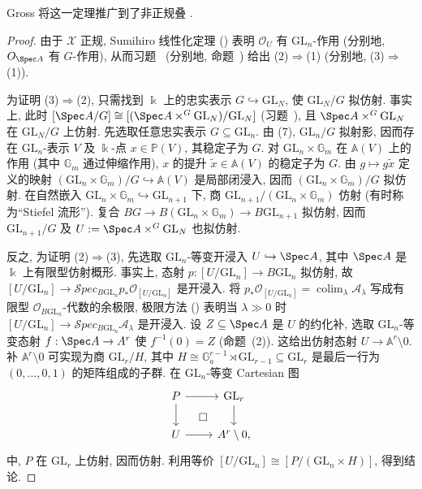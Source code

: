 \begin{remark}\label{src:7.2.13}
Gross 将这一定理推广到了非正规叠 \cite{Gro17}.
\end{remark}
\begin{proof}
由于 $\mathcal X$ 正规, Sumihiro 线性化定理 () 表明 $\mathcal O_U$ 有 $\mathrm{GL}_n$-作用 (分别地, $\mathcal O_{\Spec A}$ 有 $G$-作用), 从而习题~ (分别地, 命题~) 给出 (2)$\Rightarrow$(1) (分别地, (3)$\Rightarrow$(1)).

为证明 (3)$\Rightarrow$(2), 只需找到 $\Bbbk$ 上的忠实表示 $G\hookrightarrow\mathrm{GL}_N$, 使 $\mathrm{GL}_N/G$ 拟仿射. 事实上, 此时 $[\Spec A/G]\cong[(\Spec A\times^G\mathrm{GL}_N)/\mathrm{GL}_N]$ (习题~), 且 $\Spec A\times^G\mathrm{GL}_N$ 在 $\mathrm{GL}_N/G$ 上仿射. 先选取任意忠实表示 $G\subseteq\mathrm{GL}_n$. 由 (7), $\mathrm{GL}_n/G$ 拟射影, 因而存在 $\mathrm{GL}_n$-表示 $V$ 及 $\Bbbk$-点 $x\in\mathbb P(V)$, 其稳定子为 $G$. 对 $\mathrm{GL}_n\times\mathbb G_m$ 在 $\mathbb A(V)$ 上的作用 (其中 $\mathbb G_m$ 通过伸缩作用), $x$ 的提升 $\widetilde x\in\mathbb A(V)$ 的稳定子为 $G$. 由 $g\mapsto g\widetilde x$ 定义的映射 $(\mathrm{GL}_n\times\mathbb G_m)/G\hookrightarrow\mathbb A(V)$ 是局部闭浸入, 因而 $(\mathrm{GL}_n\times\mathbb G_m)/G$ 拟仿射. 在自然嵌入 $\mathrm{GL}_n\times\mathbb G_m\hookrightarrow\mathrm{GL}_{n+1}$ 下, 商 $\mathrm{GL}_{n+1}/(\mathrm{GL}_n\times\mathbb G_m)$ 仿射 (有时称为``Stiefel 流形''). 复合 $BG\to B(\mathrm{GL}_n\times\mathbb G_m)\to B\mathrm{GL}_{n+1}$ 拟仿射, 因而 $\mathrm{GL}_{n+1}/G$ 及 $U:=\Spec A\times^G\mathrm{GL}_N$ 也拟仿射.

反之, 为证明 (2)$\Rightarrow$(3), 先选取 $\mathrm{GL}_n$-等变开浸入 $U\hookrightarrow\Spec A$, 其中 $\Spec A$ 是 $\Bbbk$ 上有限型仿射概形. 事实上, 态射 $p:[U/\mathrm{GL}_n]\to B\mathrm{GL}_n$ 拟仿射, 故 $[U/\mathrm{GL}_n]\to\mathcal S\!pec_{B\mathrm{GL}_n}p_*\mathcal O_{[U/\mathrm{GL}_n]}$ 是开浸入. 将 $p_*\mathcal O_{[U/\mathrm{GL}_n]}=\operatorname{colim}_\lambda\mathcal A_\lambda$ 写成有限型 $\mathcal O_{B\mathrm{GL}_n}$-代数的余极限, 极限方法 () 表明当 $\lambda\gg0$ 时 $[U/\mathrm{GL}_n]\to\mathcal S\!pec_{B\mathrm{GL}_n}\mathcal A_\lambda$ 是开浸入. 设 $Z\subseteq\Spec A$ 是 $U$ 的约化补, 选取 $\mathrm{GL}_n$-等变态射 $f:\Spec A\to\mathbb A^r$ 使 $f^{-1}(0)=Z$ (命题~(2)). 这给出仿射态射 $U\to\mathbb A^r\setminus0$. 补 $\mathbb A^r\setminus0$ 可实现为商 $\mathrm{GL}_r/H$, 其中 $H\cong\mathbb G_a^{r-1}\rtimes\mathrm{GL}_{r-1}\subseteq\mathrm{GL}_r$ 是最后一行为 $(0,\ldots,0,1)$ 的矩阵组成的子群. 在 $\mathrm{GL}_n$-等变 Cartesian 图
\[
\begin{tikzcd}[ampersand replacement=\&]
P\arrow[r]\arrow[d]\&\mathrm{GL}_r\arrow[d]\\
U\arrow[r]\arrow[ur,phantom,"{\square}"]\&\mathbb A^r\setminus0,
\end{tikzcd}
\]
中, $P$ 在 $\mathrm{GL}_r$ 上仿射, 因而仿射. 利用等价 $[U/\mathrm{GL}_n]\cong[P/(\mathrm{GL}_n\times H)]$, 得到结论.


\end{proof}

